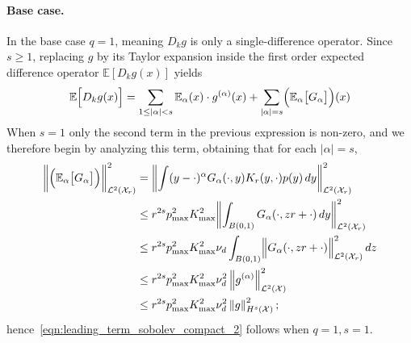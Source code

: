 \documentclass{article}
\newcommand{\abs}[1]{\left \lvert #1 \right \rvert}
\newcommand{\norm}[1]{\left \lVert #1 \right \rVert}
\newcommand{\1}{\mathbf{1}}
\newcommand{\Xset}{\mathcal{X}}
\newcommand{\Leb}{\mathcal{L}}
\newcommand{\Ebb}{\mathbb{E}}
\theoremstyle{alden}
\theoremstyle{aldenthm}
\theoremstyle{definition}
\theoremstyle{remark}
\begin{document}
\paragraph{Base case.}
In the base case $q = 1$, meaning $D_kg$ is only a single-difference operator.
Since $s \geq 1$, replacing $g$ by its Taylor expansion inside the first order expected difference operator $\Ebb[D_kg(x)]$ yields
\begin{equation}
\label{eqn:leading_term_sobolev_compact_pf1}
\Ebb\Bigl[D_kg(x)\Bigr] = \sum_{1 \leq \abs{\alpha} < s} \Ebb_{\alpha}(x) \cdot g^{(\alpha)}(x)  + \sum_{\abs{\alpha} = s} \Bigl(\Ebb_{\alpha}\bigl[G_{\alpha}\bigr]\Bigr)(x)
\end{equation}
When $s = 1$ only the second term in the previous expression is non-zero, and we therefore begin by analyzing this term, obtaining that for each $\abs{\alpha} = s$,
\begin{align}
\biggl\|\Bigl(\Ebb_{\alpha}\bigl[G_{\alpha}\bigr]\Bigr)\biggr\|_{\Leb^2(\Xset_{r})}^2 & = \biggl\|\int (y - \cdot)^{\alpha} G_{\alpha}(\cdot,y) K_r(y,\cdot) p(y) \,dy\biggr\|_{\Leb^2(\Xset_{r})}^2 \nonumber \\
& \leq r^{2s} p_{\max}^2 K_{\max}^2  \biggl\|\int_{B(0,1)} G_{\alpha}(\cdot,zr + \cdot) \,dy\biggr\|_{\Leb^2(\Xset_{r})}^2 \nonumber \\
& \leq r^{2s} p_{\max}^2 K_{\max}^2 \nu_d \int_{B(0,1)} \Bigl\|G_{\alpha}(\cdot,zr + \cdot)\Bigr\|_{\Leb^2(\Xset_{r})}^2 \,dz \nonumber \\
& \leq r^{2s} p_{\max}^2 K_{\max}^2 \nu_d^2 \norm{g^{(\alpha)}}_{\Leb^2(\Xset)}^2 \nonumber \\
& \leq r^{2s} p_{\max}^2 K_{\max}^2 \nu_d^2 \norm{g}_{H^s(\Xset)}^2; \nonumber
\end{align}
hence~\eqref{eqn:leading_term_sobolev_compact_2} follows when $q = 1, s = 1$.
\end{document}
